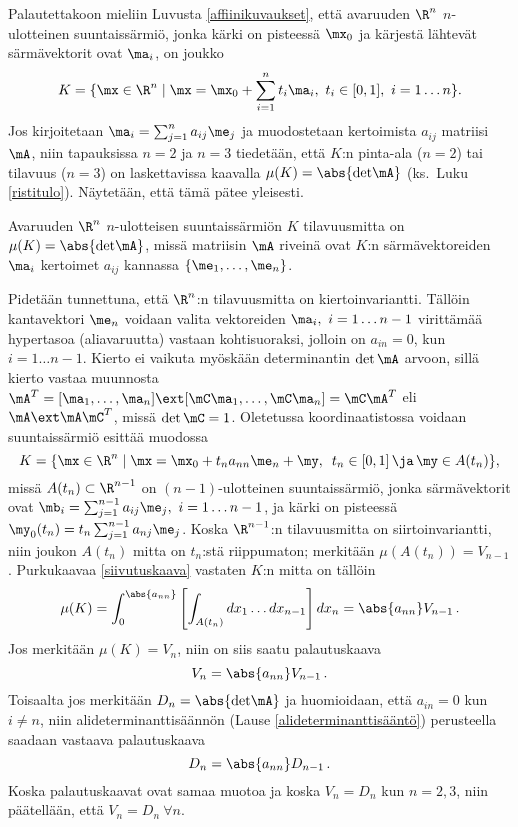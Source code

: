 Palautettakoon mieliin Luvusta \ref{affiinikuvaukset}, että avaruuden $\R^n$ $n$-ulotteinen
suuntaissärmiö, jonka kärki on pisteessä $\mx_0$ ja kärjestä lähtevät särmävektorit ovat
$\ma_i$, on joukko
\[
K=\{\mx\in\R^n \mid \mx=\mx_0+\sum_{i=1}^n t_i\ma_i,\ t_i\in[0,1],\ i=1 \ldots n\}.
\]
Jos kirjoitetaan $\ma_i=\sum_{j=1}^n a_{ij}\me_j$ ja muodostetaan kertoimista $a_{ij}$ matriisi
$\mA$, niin tapauksissa $n=2$ ja $n=3$ tiedetään, että $K$:n pinta-ala ($n=2$) tai tilavuus
($n=3$) on laskettavissa kaavalla $\mu(K)=\abs{\text{det}\mA}$ (ks.\ Luku \ref{ristitulo}).
Näytetään, että tämä pätee yleisesti.
\begin{Prop} \label{suuntaissärmiön tilavuuskaava} Avaruuden $\R^n$ $n$-ulotteisen 
suuntaissärmiön $K$ tilavuusmitta on $\mu(K)=\abs{\text{det}\mA}$, missä matriisin $\mA$ riveinä
ovat $K$:n särmävektoreiden $\ma_i$ kertoimet $a_{ij}$ kannassa $\{\me_1,\ldots,\me_n\}$.
\end{Prop}
\tod Pidetään tunnettuna, että $\R^n$:n tilavuusmitta on kiertoinvariantti. Tällöin 
kantavektori $\me_n$ voidaan valita vektoreiden $\ma_i,\ i=1 \ldots n-1$ virittämää hypertasoa
(aliavaruutta) vastaan kohtisuoraksi, jolloin on $a_{in}=0$, kun $i=1 \ldots n-1$. Kierto
ei vaikuta myöskään determinantin $\det\mA$ arvoon, sillä kierto vastaa muunnosta
$\mA^T=[\ma_1,\ldots,\ma_n] \ext [\mC\ma_1,\ldots,\mC\ma_n]=\mC\mA^T$ eli $\mA \ext \mA\mC^T$,
missä $\det\mC=1$. Oletetussa koordinaatistossa voidaan suuntaissärmiö esittää muodossa
\[
K=\{\mx\in\R^n \mid \mx=\mx_0+t_n a_{nn}\me_n+\my,\,\ t_n\in[0,1]\,\ja\,\my \in A(t_n)\},
\]
missä $A(t_n)\subset\R^{n-1}$ on $(n-1)$-ulotteinen suuntaissärmiö, jonka särmävektorit ovat 
$\mb_i=\sum_{j=1}^{n-1} a_{ij}\me_j,\ i=1 \ldots n-1$, ja kärki on pisteessä
$\my_0(t_n)=t_n\sum_{j=1}^{n-1} a_{nj}\me_j$. Koska $\R^{n-1}$:n tilavuusmitta on 
siirtoinvariantti, niin joukon $A(t_n)$ mitta on $t_n$:stä riippumaton; merkitään
$\mu(A(t_n))=V_{n-1}$. Purkukaavaa \eqref{siivutuskaava} vastaten $K$:n mitta on tällöin
\[
\mu(K)=\int_0^{\abs{a_{nn}}}\left[\int_{A(t_n)} dx_1 \ldots dx_{n-1}\right]dx_n
      =\abs{a_{nn}}V_{n-1}\,.
\]
Jos merkitään $\mu(K)=V_n$, niin on siis saatu palautuskaava
\[
V_n=\abs{a_{nn}}V_{n-1}\,.
\]
Toisaalta jos merkitään $D_n=\abs{\text{det}\mA}$ ja huomioidaan, että $a_{in}=0$ kun 
$i \neq n$, niin alideterminanttisäännön (Lause \ref{alideterminanttisääntö}) perusteella
saadaan vastaava palautuskaava
\[
D_n=\abs{a_{nn}}D_{n-1}\,.
\]
Koska palautuskaavat ovat samaa muotoa ja koska $V_n=D_n$ kun $n=2,3$, niin päätellään, että
$V_n=D_n\ \forall n$. \loppu

